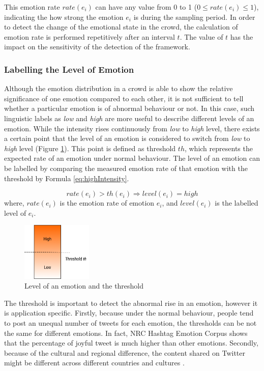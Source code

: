 This emotion rate \(rate(e_i)\) can have any value from 0 to 1 (\(0 \leq rate(e_i) \leq 1\)), indicating the how strong the emotion \(e_i\) is during the sampling period. In order to detect the change of the emotional state in the crowd, the calculation of emotion rate is performed repetitively after an interval \(t\). The value of \(t\) has the impact on the sensitivity of the detection of the framework.

\subsubsection{Labelling the Level of Emotion}
Although the emotion distribution in a crowd is able to show the relative significance of one emotion compared to each other, it is not sufficient to tell whether a particular emotion is of abnormal behaviour or not. In this case, such linguistic labels as \textit{low} and \textit{high} are more useful to describe different levels of an emotion. While the intensity rises continuously from \textit{low} to \textit{high} level, there exists a certain point that the level of an emotion is considered to switch from \textit{low} to \textit{high} level (Figure \ref{fig:levelOfDensity}). This point is defined as threshold \(th\), which represents the expected rate of an emotion under normal behaviour. The level of an emotion can be labelled by comparing the measured emotion rate of that emotion with the threshold by Formula \ref{eq:highIntensity}.

\begin{equation}
\label{eq:highIntensity}
	rate(e_i) > th(e_i) \Rightarrow level(e_i) = high
\end{equation}
where, \(rate(e_i)\) is the emotion rate of emotion \(e_i\), and \(level(e_i)\) is the labelled level of \(e_i\).

\begin{figure}[htb!] 
\centering    
\includegraphics[width=0.3\textwidth]{LevelOfEmotion}
\caption{Level of an emotion and the threshold}
\label{fig:levelOfDensity}
\end{figure}

The threshold is important to detect the abnormal rise in an emotion, however it is application specific. Firstly, because under the normal behaviour, people tend to post an unequal number of tweets for each emotion, the thresholds can be not the same for different emotions. In fact, NRC Hashtag Emotion Corpus \citep{mohammad2014using} shows that the percentage of joyful tweet is much higher than other emotions. Secondly, because of the cultural and regional difference, the content shared on Twitter might be different across different countries and cultures \citep{Larsen2015}. 

